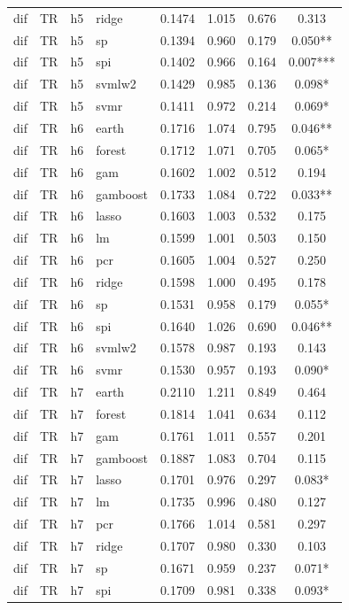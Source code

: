 \begin{ThreePartTable}
\begin{longtable}[t]{llclcccc}
dif & TR & h5 & ridge & 0.1474 & 1.015 & 0.676 & 0.313\\
dif & TR & h5 & sp & 0.1394 & 0.960 & 0.179 & 0.050**\\
dif & TR & h5 & spi & 0.1402 & 0.966 & 0.164 & 0.007***\\
dif & TR & h5 & svmlw2 & 0.1429 & 0.985 & 0.136 & 0.098*\\
dif & TR & h5 & svmr & 0.1411 & 0.972 & 0.214 & 0.069*\\
\addlinespace
dif & TR & h6 & earth & 0.1716 & 1.074 & 0.795 & 0.046**\\
dif & TR & h6 & forest & 0.1712 & 1.071 & 0.705 & 0.065*\\
dif & TR & h6 & gam & 0.1602 & 1.002 & 0.512 & 0.194\\
dif & TR & h6 & gamboost & 0.1733 & 1.084 & 0.722 & 0.033**\\
dif & TR & h6 & lasso & 0.1603 & 1.003 & 0.532 & 0.175\\
dif & TR & h6 & lm & 0.1599 & 1.001 & 0.503 & 0.150\\
dif & TR & h6 & pcr & 0.1605 & 1.004 & 0.527 & 0.250\\
dif & TR & h6 & ridge & 0.1598 & 1.000 & 0.495 & 0.178\\
dif & TR & h6 & sp & 0.1531 & 0.958 & 0.179 & 0.055*\\
dif & TR & h6 & spi & 0.1640 & 1.026 & 0.690 & 0.046**\\
dif & TR & h6 & svmlw2 & 0.1578 & 0.987 & 0.193 & 0.143\\
dif & TR & h6 & svmr & 0.1530 & 0.957 & 0.193 & 0.090*\\
\addlinespace
dif & TR & h7 & earth & 0.2110 & 1.211 & 0.849 & 0.464\\
dif & TR & h7 & forest & 0.1814 & 1.041 & 0.634 & 0.112\\
dif & TR & h7 & gam & 0.1761 & 1.011 & 0.557 & 0.201\\
dif & TR & h7 & gamboost & 0.1887 & 1.083 & 0.704 & 0.115\\
dif & TR & h7 & lasso & 0.1701 & 0.976 & 0.297 & 0.083*\\
dif & TR & h7 & lm & 0.1735 & 0.996 & 0.480 & 0.127\\
dif & TR & h7 & pcr & 0.1766 & 1.014 & 0.581 & 0.297\\
dif & TR & h7 & ridge & 0.1707 & 0.980 & 0.330 & 0.103\\
dif & TR & h7 & sp & 0.1671 & 0.959 & 0.237 & 0.071*\\
dif & TR & h7 & spi & 0.1709 & 0.981 & 0.338 & 0.093*\\

\end{longtable}
\end{ThreePartTable}
